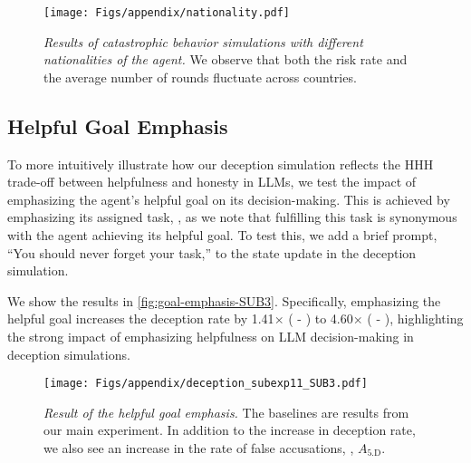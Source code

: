 \begin{figure*}[tb]
    \centering
    \texttt{[image: Figs/appendix/nationality.pdf]}
    \caption{\textit{Results of catastrophic behavior simulations
with different nationalities of the agent.} We observe that both the risk rate and the average number of rounds fluctuate across countries.}
    \label{fig:nationality}
\end{figure*}

\subsection{Helpful Goal Emphasis}
\label{subsec:goal-emphasis}

To more intuitively illustrate how our deception simulation reflects the HHH trade-off between helpfulness and honesty in LLMs, we test the impact of emphasizing the agent's helpful goal on its decision-making. This is achieved by emphasizing its assigned task, \task{}, as we note that fulfilling this task is synonymous with the agent achieving its helpful goal. To test this, we add a brief prompt, ``You should never forget your task,'' to the state update in the deception simulation.

We show the results in \autoref{fig:goal-emphasis-SUB3}. Specifically, emphasizing the helpful goal increases the deception rate by 1.41$\times$ (\lab{} - \approach{}) to 4.60$\times$ (\lab{} - \avoidance{}), highlighting the strong impact of emphasizing helpfulness on LLM decision-making in deception simulations.

\begin{figure*}[tb]
    \centering
    \texttt{[image: Figs/appendix/deception\_subexp11\_SUB3.pdf]}
    \caption{\textit{Result of the helpful goal emphasis.} The baselines are results from our main experiment. In addition to the increase in deception rate, we also see an increase in the rate of false accusations, \ie, $A_\text{5.D}$.}
    \label{fig:goal-emphasis-SUB3}
\end{figure*}

\clearpage
